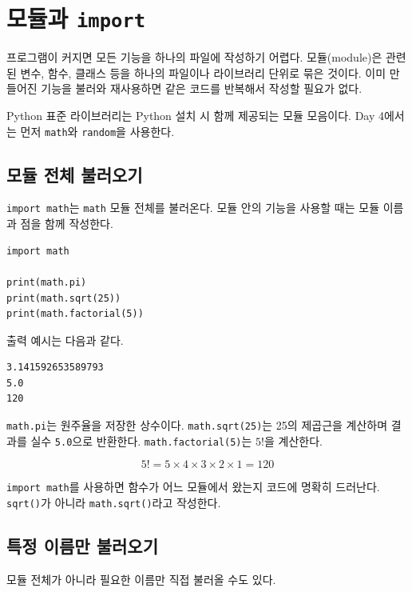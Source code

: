 \documentclass[11pt,a4paper]{article}
\begin{document}
\section{모듈과 \texttt{import}}

프로그램이 커지면 모든 기능을 하나의 파일에 작성하기 어렵다. 모듈(module)은 관련된 변수, 함수, 클래스 등을 하나의 파일이나 라이브러리 단위로 묶은 것이다. 이미 만들어진 기능을 불러와 재사용하면 같은 코드를 반복해서 작성할 필요가 없다.

Python 표준 라이브러리는 Python 설치 시 함께 제공되는 모듈 모음이다. Day 4에서는 먼저 \texttt{math}와 \texttt{random}을 사용한다.

\subsection{모듈 전체 불러오기}

\texttt{import math}는 \texttt{math} 모듈 전체를 불러온다. 모듈 안의 기능을 사용할 때는 모듈 이름과 점을 함께 작성한다.

\begin{lstlisting}
import math

print(math.pi)
print(math.sqrt(25))
print(math.factorial(5))
\end{lstlisting}

출력 예시는 다음과 같다.

\begin{verbatim}
3.141592653589793
5.0
120
\end{verbatim}

\texttt{math.pi}는 원주율을 저장한 상수이다. \texttt{math.sqrt(25)}는 25의 제곱근을 계산하며 결과를 실수 \texttt{5.0}으로 반환한다. \texttt{math.factorial(5)}는 $5!$을 계산한다.

\[
5! = 5\times4\times3\times2\times1 = 120
\]

\begin{importantbox}
\texttt{import math}를 사용하면 함수가 어느 모듈에서 왔는지 코드에 명확히 드러난다. \texttt{sqrt()}가 아니라 \texttt{math.sqrt()}라고 작성한다.
\end{importantbox}

\subsection{특정 이름만 불러오기}

모듈 전체가 아니라 필요한 이름만 직접 불러올 수도 있다.
\end{document}
